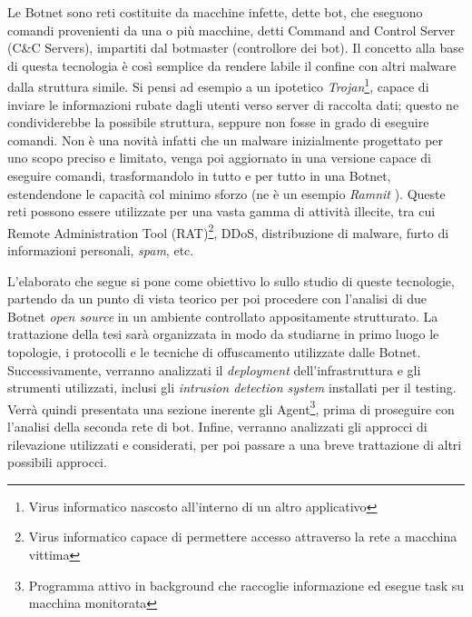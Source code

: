 Le Botnet sono reti costituite da macchine infette, dette bot, che eseguono comandi provenienti da una o più macchine, detti Command and Control Server (C\&C Servers), impartiti dal botmaster (controllore dei bot). Il concetto alla base di questa tecnologia è così semplice da rendere labile il confine con altri malware dalla struttura simile. Si pensi ad esempio a un ipotetico \textit{Trojan}\footnote{Virus informatico nascosto all'interno di un altro applicativo}, capace di inviare le informazioni rubate dagli utenti verso server di raccolta dati; questo ne condividerebbe la possibile struttura, seppure non fosse in grado di eseguire comandi. Non è una novità infatti che un malware inizialmente progettato per uno scopo preciso e limitato, venga poi aggiornato in una versione capace di eseguire comandi, trasformandolo in tutto e per tutto in una Botnet, estendendone le capacità col minimo sforzo (ne è un esempio \textit{Ramnit} \cite{IBMSecBlogRamnit}). Queste reti possono essere utilizzate per una vasta gamma di attività illecite, tra cui  Remote Administration Tool (RAT)\footnote{Virus informatico capace di permettere accesso attraverso la rete a macchina vittima}, DDoS, distribuzione di malware, furto di informazioni personali, \textit{spam}, etc.

L’elaborato che segue si pone come obiettivo lo sullo studio di queste tecnologie, partendo da un punto di vista teorico per poi procedere con l'analisi di due Botnet \textit{open source} in un ambiente controllato appositamente strutturato. La trattazione della tesi sarà organizzata in modo da studiarne in primo luogo le topologie, i protocolli e le tecniche di offuscamento utilizzate dalle Botnet. Successivamente, verranno analizzati il \textit{deployment} dell'infrastruttura e gli strumenti utilizzati, inclusi gli  \textit{intrusion detection system} installati per il testing. Verrà quindi presentata una sezione inerente gli Agent\footnote{Programma attivo in background che raccoglie informazione ed esegue task su macchina monitorata}, prima di proseguire con l’analisi della seconda rete di bot. Infine, verranno analizzati gli approcci di rilevazione utilizzati e considerati, per poi passare a una breve trattazione di altri possibili approcci.
